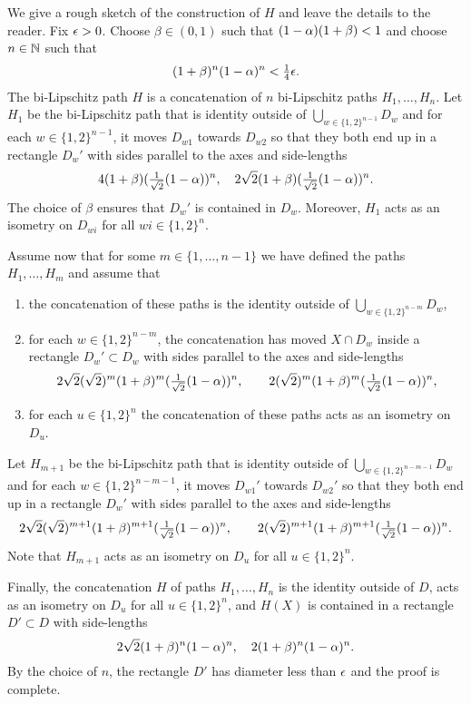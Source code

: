 \documentclass{amsart}
\begin{document}
We give a rough sketch of the construction of $H$ and leave the details to the reader. Fix $\epsilon>0$. Choose $\beta\in (0,1)$ such that $(1-\alpha)(1+\beta)<1$ and choose $n\in\mathbb{N}$ such that 
\[  (1+\beta)^{n}(1-\alpha)^n< \tfrac14\epsilon.\] 
The bi-Lipschitz path $H$ is a concatenation of $n$ bi-Lipschitz paths $H_1,\dots,H_n$. Let $H_1$ be the bi-Lipschitz path that is identity outside of $\bigcup_{w\in \{1,2\}^{n-1}}D_w$ and for each $w\in\{1,2\}^{n-1}$, it moves $D_{w1}$ towards $D_{w2}$ so that they both end up in a rectangle $D_w'$ with sides parallel to the axes and side-lengths 
\[ 4(1+\beta)(\tfrac1{\sqrt{2}}(1-\alpha))^{n}, \quad 2\sqrt{2}(1+\beta)(\tfrac1{\sqrt{2}}(1-\alpha))^{n}.\] 
The choice of $\beta$ ensures that $D_w'$ is contained in $D_w$. Moreover, $H_1$ acts as an isometry on $D_{wi}$ for all $wi\in\{1,2\}^{n}$.

Assume now that for some $m\in \{1,\dots,n-1\}$ we have defined the paths $H_1,\dots,H_m$ and assume that 
\begin{enumerate}
\item the concatenation of these paths  is the identity outside of $\bigcup_{w\in \{1,2\}^{n-m}} D_w$,
\item for each $w\in  \{1,2\}^{n-m}$, the concatenation has moved $X\cap D_w$ inside a rectangle $D_{w}' \subset D_w$ with sides parallel to the axes and side-lengths 
\[ 2\sqrt{2}(\sqrt{2})^{m}(1+\beta)^{m}(\tfrac1{\sqrt{2}}(1-\alpha))^{n}, \qquad 2(\sqrt{2})^{m}(1+\beta)^{m}(\tfrac1{\sqrt{2}}(1-\alpha))^{n},\]
\item for each $u\in\{1,2\}^n$  the concatenation of these paths acts as an isometry on $D_u$.
\end{enumerate}
Let $H_{m+1}$ be the bi-Lipschitz path that is identity outside of $\bigcup_{w\in \{1,2\}^{n-m-1}}D_w$ and for each $w\in\{1,2\}^{n-m-1}$, it moves $D_{w1}'$ towards $D_{w2}'$ so that they both end up in a rectangle $D_w'$ with sides parallel to the axes and side-lengths 
\[ 2\sqrt{2}(\sqrt{2})^{m+1}(1+\beta)^{m+1}(\tfrac1{\sqrt{2}}(1-\alpha))^{n}, \qquad 2(\sqrt{2})^{m+1}(1+\beta)^{m+1}(\tfrac1{\sqrt{2}}(1-\alpha))^{n}.\] 
Note that $H_{m+1}$ acts as an isometry on $D_{u}$ for all $u\in\{1,2\}^{n}$.

Finally, the concatenation $H$ of paths $H_1,\dots,H_n$ is the identity outside of $D$, acts as an isometry on $D_{u}$ for all $u\in\{1,2\}^{n}$, and $H(X)$ is contained in a rectangle $D' \subset D$ with side-lengths 
\[ 2\sqrt{2}(1+\beta)^{n}(1-\alpha)^n, \quad 2(1+\beta)^{n}(1-\alpha)^n.\] 
By the choice of $n$, the rectangle $D'$ has diameter less than $\epsilon$ and the proof  is complete.
\end{document}
